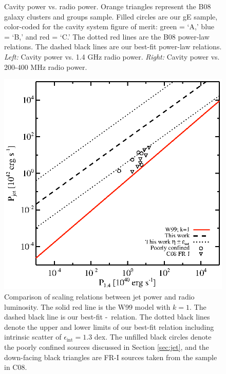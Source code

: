 \begin{center}
\begin{figure}[htp]
\begin{minipage}[htp]{0.5\linewidth}
    \end{minipage}
    \caption{Cavity power vs. radio power. Orange triangles represent
      the B08 galaxy clusters and groups sample. Filled circles are
      our gE sample, color-coded for the cavity system figure of
      merit: green = `A,' blue = `B,' and red = `C.' The dotted red
      lines are the B08 power-law relations. The dashed black lines
      are our best-fit power-law relations. {\it{Left:}} Cavity power
      vs. 1.4 GHz radio power. {\it{Right:}} Cavity power vs. 200-400
      MHz radio power.}
    \label{fig:pcav}
  \end{figure}
\end{center}

\begin{figure}[htp]
  \begin{center}
    \begin{minipage}[htp]{\linewidth}
      \includegraphics*[width=\textwidth, trim=30mm 5mm 40mm 15mm, clip]{radeff.eps}
      \caption{Comparison of scaling relations between jet power and
        radio luminosity. The solid red line is the W99 model with
        $k=1$. The dashed black line is our best-fit
        \pjet-\phigh\ relation. The dotted black lines denote the
        upper and lower limits of our best-fit relation including
        intrinsic scatter of $\epsilon_{\mathrm{int}} = 1.3$ dex. The
        unfilled black circles denote the poorly confined sources
        discussed in Section \ref{sec:jet}, and the down-facing black
        triangles are FR-I sources taken from the sample in C08.}
      \label{fig:radeff}
    \end{minipage}
  \end{center}
\end{figure}

